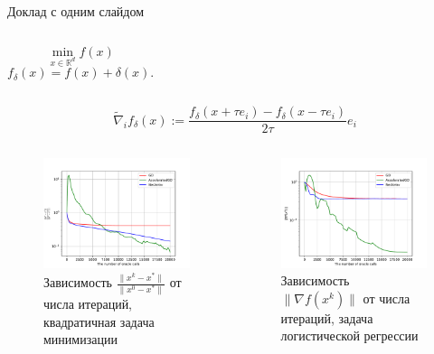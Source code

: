 \documentclass{beamer}
\begin{document}
\begin{frame}{Доклад с одним слайдом}

\begin{columns}[c]
    $$\min\limits_{x \in \mathbb{R}^d} f(x)$$
    $$f_\delta (x) = f(x) + \delta (x).$$
\end{columns}

$$\widetilde{\nabla}_i f_\delta (x) := \frac{f_\delta (x + \tau e_i) - f_\delta (x - \tau e_i)}{2\tau} e_i$$

\begin{columns}[c]
    \begin{figure}
    \includegraphics[width=1.0\textwidth]{Deterministic_quadratic_GD_AGD_Nesterov_15.pdf}
        \caption*{Зависимость $\frac{\|x^k - x^*\|}{\|x^0 - x^*\|}$ от числа итераций, квадратичная задача минимизации}
    \end{figure}

    \begin{figure}
    \includegraphics[width=1.0\textwidth]{Non_stochastic_Logreg_GD_AGD_Nesterov_15_1e-07_1e-05.pdf}
        \caption*{Зависимость $\|\nabla f(x^k)\|$ от числа итераций, задача логистической регрессии}
    \end{figure}
\end{columns}


\end{frame}
\end{document}

